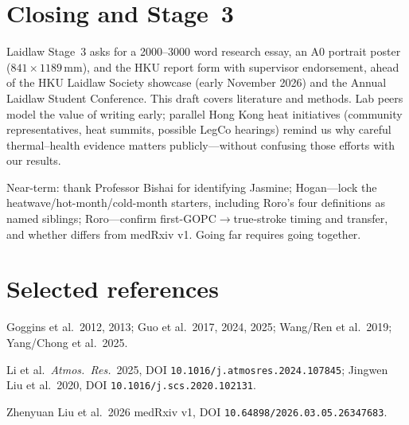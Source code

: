 \documentclass[11pt,a4paper]{article}
\begin{document}
\section{Closing and Stage~3}
Laidlaw Stage~3 asks for a 2000--3000 word research essay, an A0 portrait poster ($841\times 1189$\,mm), and the HKU report form with supervisor endorsement, ahead of the HKU Laidlaw Society showcase (early November 2026) and the Annual Laidlaw Student Conference. This draft covers literature and methods. Lab peers model the value of writing early; parallel Hong Kong heat initiatives (community representatives, heat summits, possible LegCo hearings) remind us why careful thermal--health evidence matters publicly---without confusing those efforts with our results.

Near-term: thank Professor Bishai for identifying Jasmine; Hogan---lock the heatwave/hot-month/cold-month starters, including Roro's four definitions as named siblings; Roro---confirm first-GOPC$\to$true-stroke timing and transfer, and whether  differs from medRxiv v1. Going far requires going together.

\section*{Selected references}
{\small
Goggins et al.\ 2012, 2013; Guo et al.\ 2017, 2024, 2025; Wang/Ren et al.\ 2019; Yang/Chong et al.\ 2025.\par
Li et al.\ \emph{Atmos.\ Res.}\ 2025, DOI \nolinkurl{10.1016/j.atmosres.2024.107845}; Jingwen Liu et al.\ 2020, DOI \nolinkurl{10.1016/j.scs.2020.102131}.\par
Zhenyuan Liu et al.\ 2026 medRxiv v1, DOI \nolinkurl{10.64898/2026.03.05.26347683}.
}
\end{document}
